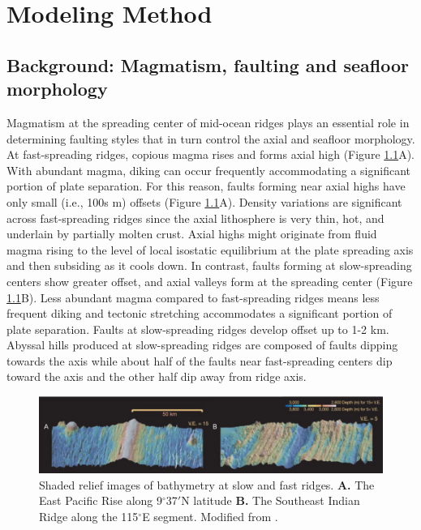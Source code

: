 \documentclass[letterpaper,12pt,notitle]{memphisthesis}                     %
\begin{document}
\chapter{Modeling Method}

\section{Background: Magmatism, faulting and seafloor morphology}
Magmatism at the spreading center of mid-ocean ridges plays an essential role in determining faulting styles that in turn control the axial and seafloor morphology. At fast-spreading ridges, copious magma rises and forms axial high (Figure \ref{fig:ridgebathymetry}A). With abundant magma, diking can occur frequently accommodating a significant portion of plate separation. For this reason, faults forming near axial highs have only small (i.e., 100s m) offsets (Figure \ref{fig:ridgebathymetry}A). Density variations are significant across fast-spreading ridges since the axial lithosphere is very thin, hot, and underlain by partially molten crust. Axial highs might originate from fluid magma rising to the level of local isostatic equilibrium at the plate spreading axis and then subsiding as it cools down. In contrast, faults forming at slow-spreading centers show greater offset, and axial valleys form at the spreading center (Figure \ref{fig:ridgebathymetry}B). Less abundant magma compared to fast-spreading ridges means less frequent diking and tectonic stretching accommodates a significant portion of plate separation. Faults at slow-spreading ridges develop offset up to 1-2 km. Abyssal hills produced at slow-spreading ridges are composed of faults dipping towards the axis while about half of the faults near fast-spreading centers dip toward the axis and the other half dip away from ridge axis.

\begin{figure}[!htb]
	\centering
	\includegraphics[width=0.99\linewidth]{./figs/bathy_buck.png}
	\caption{Shaded relief images of bathymetry at slow and fast ridges. \textbf{A.} The East Pacific Rise along 9$^\circ$37$'$N latitude \textbf{B.} The Southeast Indian Ridge along the 115$^\circ$E segment. Modified from \citet{Buck2005}.}
	\label{fig:ridgebathymetry}
\end{figure}
\end{document}
